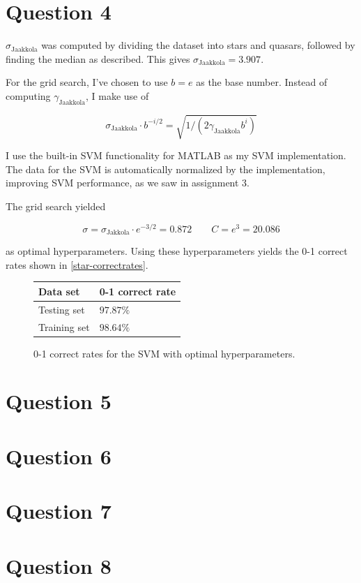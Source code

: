 \documentclass[11pt,a4paper]{article}
\begin{document}
\section{Question 4}
$\sigma_{\text{Jaakkola}}$ was computed by dividing the dataset into stars
and quasars, followed by finding the median as described. This gives
$\sigma_{\text{Jaakkola}} = 3.907$.

For the grid search, I've chosen to use $b = e$ as the base number. Instead of
computing $\gamma_{\text{Jaakkola}}$, I make use of

\[
    \sigma_{\text{Jaakkola}} \cdot b^{-i/2} = \sqrt{1/(2 \gamma_{\text{Jaakkola}} b^i)}
\]

I use the built-in SVM functionality for MATLAB as my SVM implementation. The
data for the SVM is automatically normalized by the implementation, improving
SVM performance, as we saw in assignment 3.

The grid search yielded

\[ \sigma = \sigma_{\text{Jakkola}} \cdot e^{-3/2} = 0.872 \quad\quad C = e^3 = 20.086 \]

as optimal hyperparameters. Using these hyperparameters yields the 0-1 correct rates shown in
\autoref{star-correctrates}. 

\begin{figure}[h!]
    \centering
    \begin{tabular}{|l|l|}
        \hline
        Data set & 0-1 correct rate \\
        \hline
        Testing set & $97.87\%$ \\
        Training set & $98.64\%$ \\
        \hline
    \end{tabular}
    \label{star-correctrates}
    \caption{0-1 correct rates for the SVM with optimal hyperparameters.}
\end{figure}

\section{Question 5}


\section{Question 6}


\section{Question 7}


\section{Question 8}
\end{document}
